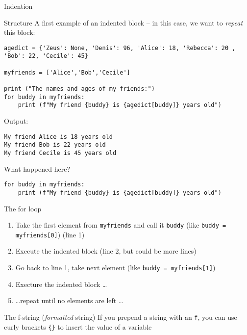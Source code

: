 \begin{frame}[fragile]{Indention}
\begin{block}{Structure}
	A first example of an indented block -- in this case, we want to \emph{repeat} this block:
\end{block}
\begin{verbatim}
agedict = {'Zeus': None, 'Denis': 96, 'Alice': 18, 'Rebecca': 20 , 'Bob': 22, 'Cecile': 45}

myfriends = ['Alice','Bob','Cecile']

print ("The names and ages of my friends:")
for buddy in myfriends:
	print (f"My friend {buddy} is {agedict[buddy]} years old")
\end{verbatim}

Output:
\begin{verbatim}
My friend Alice is 18 years old
My friend Bob is 22 years old
My friend Cecile is 45 years old
\end{verbatim}
\end{frame}

\begin{frame}[fragile]{What happened here?}

\begin{verbatim}
for buddy in myfriends:
    print (f"My friend {buddy} is {agedict[buddy]} years old")
\end{verbatim}

\small
	\begin{block}{The for loop}
\begin{enumerate}
	\item Take the first element from \texttt{myfriends} and call it \texttt{buddy} (like \texttt{buddy = myfriends[0]}) (line 1)
	\item Execute the indented block (line 2, but could be more lines)
	\item Go back to line 1, take next element  (like \texttt{buddy = myfriends[1]}) 
	\item Execture the indented block \ldots
	\item \ldots repeat until no elements are left \ldots
\end{enumerate}
	\end{block}
	
	\begin{block}{The f-string (\emph{formatted} string)}
If you prepend a string with an \texttt{f}, you can use curly brackets \texttt{\{\}} to insert the value of a variable
	\end{block}
	
\end{frame}




